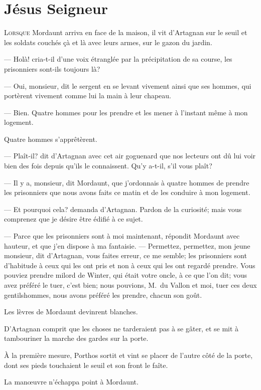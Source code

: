 \chapter{Jésus Seigneur}

\lettrine{L}{orsque} Mordaunt arriva en face de la maison, il vit d'Artagnan sur le seuil et les soldats couchés çà et là avec leurs armes, sur le gazon du jardin.

\zz
— Holà! cria-t-il d'une voix étranglée par la précipitation de sa course, les prisonniers sont-ils toujours là?

— Oui, monsieur, dit le sergent en se levant vivement ainsi que ses hommes, qui portèrent vivement comme lui la main à leur chapeau.

— Bien. Quatre hommes pour les prendre et les mener à l'instant même à mon logement.

Quatre hommes s'apprêtèrent.

— Plaît-il? dit d'Artagnan avec cet air goguenard que nos lecteurs ont dû lui voir bien des fois depuis qu'ils le connaissent. Qu'y a-t-il, s'il vous plaît?

— Il y a, monsieur, dit Mordaunt, que j'ordonnais à quatre hommes de prendre les prisonniers que nous avons faits ce matin et de les conduire à mon logement.

— Et pourquoi cela? demanda d'Artagnan. Pardon de la curiosité; mais vous comprenez que je désire être édifié à ce sujet.

— Parce que les prisonniers sont à moi maintenant, répondit Mordaunt avec hauteur, et que j'en dispose à ma fantaisie.
— Permettez, permettez, mon jeune monsieur, dit d'Artagnan, vous faites erreur, ce me semble; les prisonniers sont d'habitude à ceux qui les ont pris et non à ceux qui les ont regardé prendre. Vous pouviez prendre milord de Winter, qui était votre oncle, à ce que l'on dit; vous avez préféré le tuer, c'est bien; nous pouvions, M.~du Vallon et moi, tuer ces deux gentilshommes, nous avons préféré les prendre, chacun son goût.

Les lèvres de Mordaunt devinrent blanches.

D'Artagnan comprit que les choses ne tarderaient pas à se gâter, et se mit à tambouriner la marche des gardes sur la porte.

À la première mesure, Porthos sortit et vint se placer de l'autre côté de la porte, dont ses pieds touchaient le seuil et son front le faîte.

La manœuvre n'échappa point à Mordaunt.

